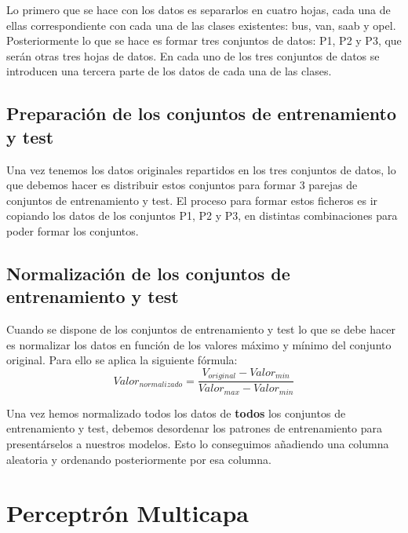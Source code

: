 \documentclass[11pt,spanish,listoffigures,listoftables]{workluis}
\begin{document}
\par Lo primero que se hace con los datos es separarlos en cuatro hojas, cada una de ellas correspondiente con cada una de las clases existentes: bus, van, saab y opel. Posteriormente lo que se hace es formar tres conjuntos de datos: P1, P2 y P3, que serán otras tres hojas de datos. En cada uno de los tres conjuntos de datos se introducen una tercera parte de los datos de cada una de las clases.

\section{Preparación de los conjuntos de entrenamiento y test}

\par Una vez tenemos los datos originales repartidos en los tres conjuntos de datos, lo que debemos hacer es distribuir estos conjuntos para formar 3 parejas de conjuntos de entrenamiento y test. El proceso para formar estos ficheros es ir copiando los datos de los conjuntos P1, P2 y P3, en distintas combinaciones para poder formar los conjuntos.

\section{Normalización de los conjuntos de entrenamiento y test}

\par Cuando se dispone de los conjuntos de entrenamiento y test lo que se debe hacer es normalizar los datos en función de los valores máximo y mínimo del conjunto original. Para ello se aplica la siguiente fórmula:
\begin{equation}\label{eq:ej}
Valor_{normalizado} = \frac{V_{original} - Valor_{min}}{Valor_{max} - Valor_{min}}
\end{equation}

\par Una vez hemos normalizado todos los datos de \textbf{todos} los conjuntos de entrenamiento y test, debemos desordenar los patrones de entrenamiento para presentárselos a nuestros modelos. Esto lo conseguimos añadiendo una columna aleatoria y ordenando posteriormente por esa columna.


\chapter{Perceptrón Multicapa}
\end{document}
